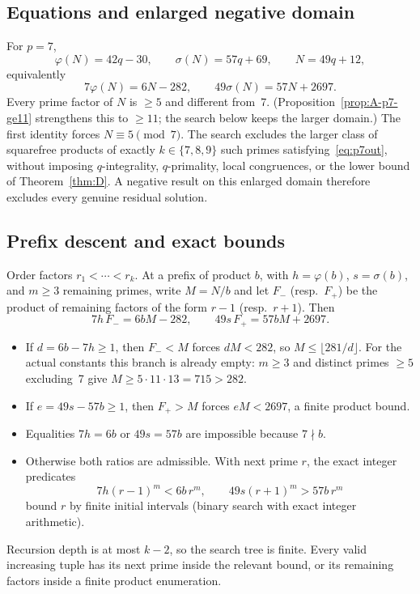 \documentclass[11pt,reqno]{amsart}
\newcommand{\ph}{\varphi}
\newcommand{\sig}{\sigma}
\theoremstyle{definition}
\begin{document}
\subsection{Equations and enlarged negative domain}
For \(p=7\),
\[
\ph(N)=42q-30,\qquad \sig(N)=57q+69,\qquad N=49q+12,
\]
equivalently
\begin{equation}
\label{eq:p7out}
7\ph(N)=6N-282,\qquad 49\sig(N)=57N+2697.
\end{equation}
Every prime factor of \(N\) is \(\ge 5\) and different from~7. (Proposition~\ref{prop:A-p7-ge11} strengthens this to \(\ge 11\); the search below keeps the larger domain.) The first identity forces \(N\equiv 5\pmod 7\). The search excludes the larger class of squarefree products of exactly \(k\in\{7,8,9\}\) such primes satisfying~\eqref{eq:p7out}, without imposing \(q\)-integrality, \(q\)-primality, local congruences, or the lower bound of Theorem~\ref{thm:D}. A negative result on this enlarged domain therefore excludes every genuine residual solution.

\subsection{Prefix descent and exact bounds}
Order factors \(r_1<\cdots<r_k\). At a prefix of product \(b\), with \(h=\ph(b)\), \(s=\sig(b)\), and \(m\ge 3\) remaining primes, write \(M=N/b\) and let \(F_-\) (resp.\ \(F_+\)) be the product of remaining factors of the form \(r-1\) (resp.\ \(r+1\)). Then
\[
7h\,F_-=6bM-282,\qquad 49s\,F_+=57bM+2697.
\]
\begin{itemize}
\item If \(d=6b-7h\ge 1\), then \(F_-<M\) forces \(dM<282\), so \(M\le\lfloor 281/d\rfloor\). For the actual constants this branch is already empty: \(m\ge 3\) and distinct primes \(\ge 5\) excluding~7 give \(M\ge 5\cdot 11\cdot 13=715>282\).
\item If \(e=49s-57b\ge 1\), then \(F_+>M\) forces \(eM<2697\), a finite product bound.
\item Equalities \(7h=6b\) or \(49s=57b\) are impossible because \(7\nmid b\).
\item Otherwise both ratios are admissible. With next prime \(r\), the exact integer predicates
\[
7h(r-1)^m<6b\,r^m,\qquad 49s(r+1)^m>57b\,r^m
\]
bound \(r\) by finite initial intervals (binary search with exact integer arithmetic).
\end{itemize}
Recursion depth is at most \(k-2\), so the search tree is finite. Every valid increasing tuple has its next prime inside the relevant bound, or its remaining factors inside a finite product enumeration.
\end{document}
